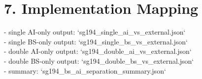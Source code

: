 \documentclass[11pt]{article}
\begin{document}
\section*{7. Implementation Mapping}

- single AI-only output: `sg194\_single\_ai\_vs\_external.json`\\
- single BS-only output: `sg194\_single\_bs\_vs\_external.json`\\
- double AI-only output: `sg194\_double\_ai\_vs\_external.json`\\
- double BS-only output: `sg194\_double\_bs\_vs\_external.json`\\
- summary: `sg194\_bs\_ai\_separation\_summary.json`\\
        
\end{document}
